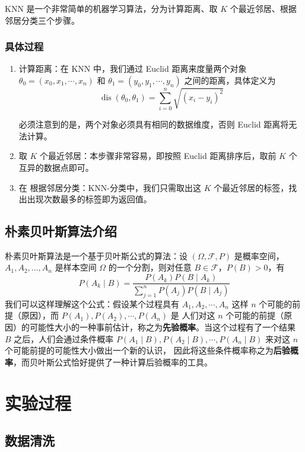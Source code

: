 \documentclass[a4paper, 11pt, cn]{elegantpaper}
\begin{document}
KNN 是一个非常简单的机器学习算法，分为计算距离、取 $K$ 个最近邻居、根据邻居分类三个步骤。

\subsubsection{具体过程}

\begin{enumerate}
    \item 计算距离：在 KNN 中，我们通过 Euclid 距离来度量两个对象 $\theta_0=\left(x_0, x_1, \cdots, x_n\right)$ 和 $\theta_1 = \left(y_0, y_1, \cdots, y_n\right)$
之间的距离，具体定义为
$$\operatorname{dis}(\theta_0, \theta_1) = \sum\limits_{i=0}^{n}\sqrt{\left(x_i - y_i\right)^2}$$

    必须注意到的是，两个对象必须具有相同的数据维度，否则 Euclid 距离将无法计算。
    \item 取 $K$ 个最近邻居：本步骤非常容易，即按照 Euclid 距离排序后，取前 $K$ 个互异的数据点即可。
    \item 在 根据邻居分类：KNN-分类中，我们只需取出这 $K$ 个最近邻居的标签，找出出现次数最多的标签即为返回值。
\end{enumerate}


\subsection{朴素贝叶斯算法介绍}

朴素贝叶斯算法是一个基于贝叶斯公式的算法：设 $(\Omega, \mathscr{F}, P)$ 是概率空间，$A_1, A_2, \dots, A_n$ 是样本空间 $\Omega$ 的一个分割，则对任意 $B \in \mathscr{F}$，$P(B) > 0$，有
$$P\left(A_k \mid B\right) = \dfrac{P(A_k)P(B \mid A_k)}{\sum\limits_{j = 1}^nP(A_j)P(B \mid A_j)}$$ 我们可以这样理解这个公式：假设某个过程具有 $A_1, A_2, \cdots, A_n$ 这样 $n$ 个可能的前提（原因），而 $P(A_1), P(A_2), \cdots, P(A_n)$ 是
人们对这 $n$ 个可能的前提（原因）的可能性大小的一种事前估计，称之为\textbf{先验概率}。当这个过程有了一个结果 $B$ 之后，人们会通过条件概率 $P(A_1 \mid B), P(A_2 \mid B), \cdots, P(A_n \mid B)$ 来对这 $n$ 个可能前提的可能性大小做出一个新的认识，
因此将这些条件概率称之为\textbf{后验概率}，而贝叶斯公式恰好提供了一种计算后验概率的工具。



\section{实验过程}

\subsection{数据清洗}
\end{document}
